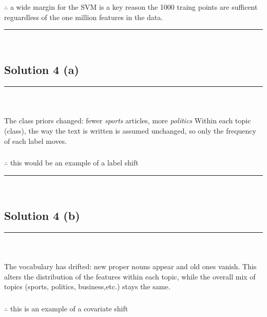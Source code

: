 \documentclass{article}
\begin{document}
\subsubsection*{\normalfont}{$\therefore$ a wide margin for the SVM is a key reason the 1000 traing points are sufficent reguardless of the one million features in the data.}

\noindent\rule{\textwidth}{0.4pt}\\

\newpage

\subsection*{Solution 4 (a)}
\noindent\rule{\textwidth}{0.4pt}\\

\subsubsection*{\normalfont}{The class priors changed: fewer \textit{sports} articles, more \textit{politics} Within each topic (class), the way the text is written is assumed unchanged, so only the frequency of each label moves.
}
\subsubsection*{\normalfont}{$\therefore$ this would be an example of a label shift}

\noindent\rule{\textwidth}{0.4pt}\\

\subsection*{Solution 4 (b)}
\noindent\rule{\textwidth}{0.4pt}\\

\subsubsection*{\normalfont}{The vocabulary has drifted: new proper nouns appear and old ones vanish. This alters the distribution of the features within each topic, while the overall mix of topics (sports, politics, business,etc.) stays the same.}

\subsubsection*{\normalfont}{$\therefore$ this is an example of a covariate shift}
\end{document}
